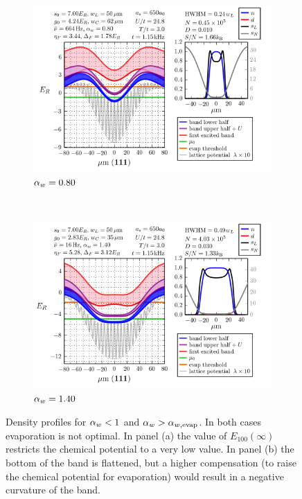 \begin{figure}
   \centering
   \begin{subfigure}[t]{0.48\textwidth}
   \includegraphics[width=\textwidth]{../figures/lda_evap/figures_hubbard-lda/2/002.png}
\caption{ $ \alpha_{w} =0.80$}
   \label{fig:alpha_less_1}
   \end{subfigure}%
   ~~ %
   \begin{subfigure}[t]{0.48\textwidth}
   \includegraphics[width=\textwidth]{../figures/lda_evap/figures_hubbard-lda/2/004.png}
\caption{ $ \alpha_{w} =1.40$}
   \label{fig:alpha_more_1} 
   \end{subfigure}%
\caption{\small Density profiles for $ \alpha_{w}  < 1$ and $ \alpha_{w}  >  \alpha_{w,\text{evap}} $.  In
both cases evaporation is not optimal.  In panel (a) the value of
$E_{100}(\infty)$ restricts the chemical potential to a very low value.  In
panel (b) the bottom of the band is flattened, but a higher compensation (to
raise the chemical potential for evaporation)  would result in a negative
curvature of the band.    }
\label{fig:alpha_less_more} 
\end{figure}
